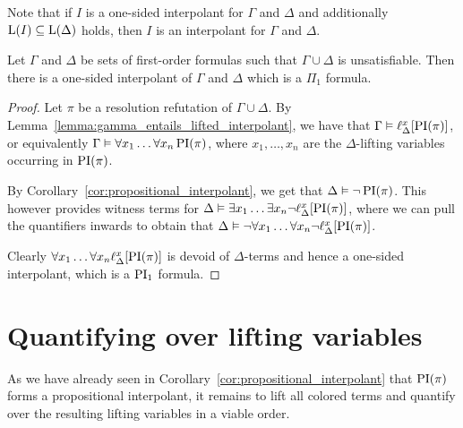 Note that if $I$ is a one-sided interpolant for $\Gamma$ and $\Delta$ and additionally $\operatorname{L}(I) \subseteq \operatorname{L}(\Delta)$ holds, then $I$ is an interpolant for $\Gamma$ and $\Delta$.

\begin{prop}
	Let $\Gamma$ and $\Delta$ be sets of first-order formulas such that $\Gamma\cup\Delta$ is unsatisfiable.
	Then there is a one-sided interpolant of $\Gamma$ and $\Delta$ which is a $\Pi_1$ formula.
\end{prop}
\begin{proof}
	Let $\pi$ be a resolution refutation of $\Gamma\cup\Delta$.
	By Lemma~\ref{lemma:gamma_entails_lifted_interpolant}, we have that
	$ \Gamma \vDash \ell_{\Delta}^{x}[\operatorname{PI}(\pi)]$,
	or equivalently
	$\Gamma \vDash \forall x_1 \dots \forall x_n  \operatorname{PI}(\pi)$, where $x_1, \dots, x_n$ are the $\Delta$-lifting variables occurring in $\operatorname{PI}(\pi)$.

	By Corollary~\ref{cor:propositional_interpolant}, we get that
	$\Delta \vDash \lnot \operatorname{PI}(\pi)$.
	This however provides witness terms for 
	$\Delta \vDash \exists x_1 \dots \exists x_n \lnot \ell_{\Delta}^{x}[ \operatorname{PI}(\pi) ]$, where we can pull the quantifiers inwards to obtain that
	$\Delta \vDash \lnot  \forall x_1 \dots \forall x_n \lnot \ell_{\Delta}^{x}[ \operatorname{PI}(\pi) ]$.

	Clearly $\forall x_1 \dots \forall x_n \ell_{\Delta}^{x}[ \operatorname{PI}(\pi) ]$ is devoid of $\Delta$-terms and hence a one-sided interpolant, which is a $\operatorname{PI}_1$ formula.
\end{proof}



\section{Quantifying over lifting variables}

As we have already seen in Corollary~\ref{cor:propositional_interpolant} that $\operatorname{PI}(\pi)$ forms a propositional interpolant, it remains to lift all colored terms and quantify over the resulting lifting variables in a viable order.



